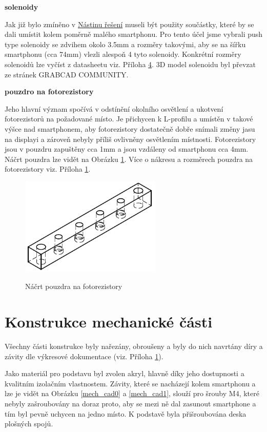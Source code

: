 \documentclass[12pt,oneside]{book} %
\begin{document}
\textbf{solenoidy}

\qquad Jak již bylo zmíněno v \hyperref[nastin]{Nástinu řešení} museli být použity součástky, které by se dali umístit kolem poměrně malého smartphonu. Pro tento účel jsme vybrali push type solenoidy se zdvihem okolo 3.5mm a rozměry takovými, aby se na šířku smartphonu (cca 74mm) vlezli alespoň 4 tyto solenoidy. Konkrétní rozměry solenoidů lze vyčíst z datasheetu viz. Příloha \hyperref[Prilohy]{4}. 3D model solenoidu byl převzat ze stránek GRABCAD COMMUNITY. \cite{grabcad}

\pagebreak
\textbf{pouzdro na fotorezistory}

\qquad Jeho hlavní význam spočívá v odstínění okolního osvětlení a ukotvení fotorezistorů na požadované místo. Je přichycen k L-profilu a umístěn v takové výšce nad smartphonem, aby fotorezistory dostatečně dobře snímali změny jasu na displayi a zároveň nebyly příliš ovlivněny osvětlením místnosti. Fotorezistory jsou v pouzdru zapuštěny cca 1mm a jsou vzdáleny od smartphonu cca 4mm. Náčrt pouzdra lze vidět na Obrázku \ref{pouzdro}. Více o nákresu a rozměrech pouzdra na fotorezistory viz. Příloha \hyperref[Prilohy]{1}.

\begin{figure}[h] \large\centering
\includegraphics[width=0.60\textwidth]{./img/pouzdro.png}\\[1cm] 
\caption{Náčrt pouzdra na fotorezistory}
\label{pouzdro}
\end{figure}  

\chapter{Konstrukce mechanické části}\label{konstr}
\qquad Všechny části konstrukce byly nařezány, obroušeny a byly do nich navrtány díry a závity dle výkresové dokumentace (viz. Příloha \hyperref[Prilohy]{1}).

\qquad Jako materiál pro podstavu byl zvolen akryl, hlavně díky jeho dostupnosti a kvalitním izolačním vlastnostem. Závity, které se nacházejí kolem smartphonu a lze je vidět na Obrázku \ref{mech_cad0} a \ref{mech_cad1}, slouží pro šrouby M4, které nebyly zašroubovány na doraz proto, aby se mezi ně dal zasunout smartphone a tím byl pevně uchycen na jedno místo. K podstavě byla přišroubována deska plošných spojů.
\end{document}
